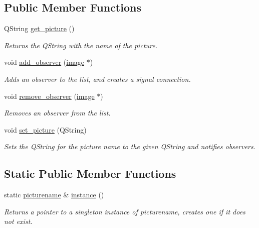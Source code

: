 \subsection*{Public Member Functions}
\begin{DoxyCompactItemize}
\item 
Q\+String \mbox{\hyperlink{classpicturename_a6b2c3caa683878aa5f95b9276502a8ae}{get\+\_\+picture}} ()
\begin{DoxyCompactList}\small\item\em Returns the Q\+String with the name of the picture. \end{DoxyCompactList}\item 
void \mbox{\hyperlink{classpicturename_a4b95f1c195e8ef08203f3e3204db5bfe}{add\+\_\+observer}} (\mbox{\hyperlink{classimage}{image}} $\ast$)
\begin{DoxyCompactList}\small\item\em Adds an observer to the list, and creates a signal connection. \end{DoxyCompactList}\item 
void \mbox{\hyperlink{classpicturename_ae4b0e336db224b42756d00dc2c8d67ba}{remove\+\_\+observer}} (\mbox{\hyperlink{classimage}{image}} $\ast$)
\begin{DoxyCompactList}\small\item\em Removes an observer from the list. \end{DoxyCompactList}\item 
void \mbox{\hyperlink{classpicturename_ab96020b531c8e2c852ea4bc17969e36c}{set\+\_\+picture}} (Q\+String)
\begin{DoxyCompactList}\small\item\em Sets the Q\+String for the picture name to the given Q\+String and notifies observers. \end{DoxyCompactList}\end{DoxyCompactItemize}
\subsection*{Static Public Member Functions}
\begin{DoxyCompactItemize}
\item 
static \mbox{\hyperlink{classpicturename}{picturename}} \& \mbox{\hyperlink{classpicturename_a2447735d7a01afd95bceadcd5cfc28f2}{instance}} ()
\begin{DoxyCompactList}\small\item\em Returns a pointer to a singleton instance of picturename, creates one if it does not exist. \end{DoxyCompactList}\end{DoxyCompactItemize}
